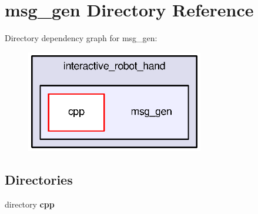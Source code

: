 \section{msg\-\_\-gen Directory Reference}
\label{dir_0fe688188313d785aac717044e2babec}
Directory dependency graph for msg\-\_\-gen\-:
\nopagebreak
\begin{figure}[H]
\begin{center}
\leavevmode
\includegraphics[width=220pt]{dir_0fe688188313d785aac717044e2babec_dep}
\end{center}
\end{figure}
\subsection*{Directories}
\begin{DoxyCompactItemize}
\item 
directory {\bf cpp}
\end{DoxyCompactItemize}
